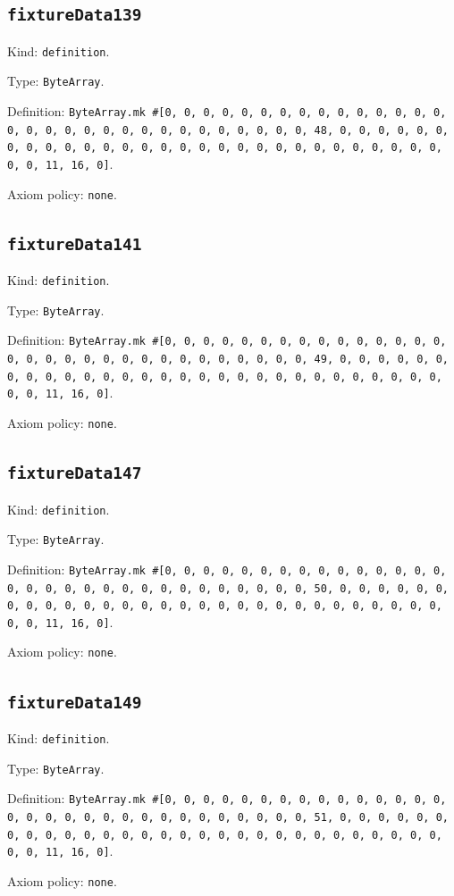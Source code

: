 \documentclass[11pt]{article}
\begin{document}
\subsection*{\texttt{fixtureData139}}
\noindent Kind: \texttt{definition}.\par
\noindent Type: \texttt{ByteArray}.\par
\noindent Definition: \texttt{ByteArray.mk \#[0, 0, 0, 0, 0, 0, 0, 0, 0, 0, 0, 0, 0, 0, 0, 0, 0, 0, 0, 0, 0, 0, 0, 0, 0, 0, 0, 0, 0, 0, 0, 48, 0, 0, 0, 0, 0, 0, 0, 0, 0, 0, 0, 0, 0, 0, 0, 0, 0, 0, 0, 0, 0, 0, 0, 0, 0, 0, 0, 0, 0, 0, 0, 11, 16, 0]}.\par
\noindent Axiom policy: \texttt{none}.\par
\subsection*{\texttt{fixtureData141}}
\noindent Kind: \texttt{definition}.\par
\noindent Type: \texttt{ByteArray}.\par
\noindent Definition: \texttt{ByteArray.mk \#[0, 0, 0, 0, 0, 0, 0, 0, 0, 0, 0, 0, 0, 0, 0, 0, 0, 0, 0, 0, 0, 0, 0, 0, 0, 0, 0, 0, 0, 0, 0, 49, 0, 0, 0, 0, 0, 0, 0, 0, 0, 0, 0, 0, 0, 0, 0, 0, 0, 0, 0, 0, 0, 0, 0, 0, 0, 0, 0, 0, 0, 0, 0, 11, 16, 0]}.\par
\noindent Axiom policy: \texttt{none}.\par
\subsection*{\texttt{fixtureData147}}
\noindent Kind: \texttt{definition}.\par
\noindent Type: \texttt{ByteArray}.\par
\noindent Definition: \texttt{ByteArray.mk \#[0, 0, 0, 0, 0, 0, 0, 0, 0, 0, 0, 0, 0, 0, 0, 0, 0, 0, 0, 0, 0, 0, 0, 0, 0, 0, 0, 0, 0, 0, 0, 50, 0, 0, 0, 0, 0, 0, 0, 0, 0, 0, 0, 0, 0, 0, 0, 0, 0, 0, 0, 0, 0, 0, 0, 0, 0, 0, 0, 0, 0, 0, 0, 11, 16, 0]}.\par
\noindent Axiom policy: \texttt{none}.\par
\subsection*{\texttt{fixtureData149}}
\noindent Kind: \texttt{definition}.\par
\noindent Type: \texttt{ByteArray}.\par
\noindent Definition: \texttt{ByteArray.mk \#[0, 0, 0, 0, 0, 0, 0, 0, 0, 0, 0, 0, 0, 0, 0, 0, 0, 0, 0, 0, 0, 0, 0, 0, 0, 0, 0, 0, 0, 0, 0, 51, 0, 0, 0, 0, 0, 0, 0, 0, 0, 0, 0, 0, 0, 0, 0, 0, 0, 0, 0, 0, 0, 0, 0, 0, 0, 0, 0, 0, 0, 0, 0, 11, 16, 0]}.\par
\noindent Axiom policy: \texttt{none}.\par
\end{document}
